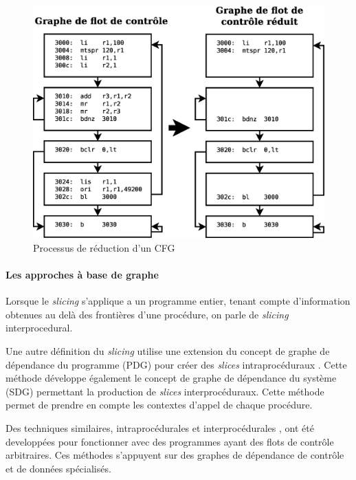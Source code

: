 {      \begin{figure}
        \centering
        \includegraphics[scale=0.3]{slice.eps}
        \caption{Processus de réduction d'un CFG}
        \label{fig:slice}
      \end{figure}

      
      \paragraph{Les approches à base de graphe}
      { Lorsque le \textit{slicing} s'applique a un programme entier, tenant
        compte d'information obtenues au delà des frontières d'une procédure, on
        parle de \textit{slicing} interprocedural.

        Une autre définition du \textit{slicing} utilise une extension du
        concept de graphe de dépendance du programme (PDG) pour créer des
        \textit{slices} intraprocéduraux \cite{HRB90}. Cette méthode développe
        également le concept de graphe de dépendance du système (SDG) permettant
        la production de \textit{slices} interprocéduraux. Cette méthode permet
        de prendre en compte les contextes d'appel de chaque procédure.

        \medskip
        
        Des techniques similaires, intraprocédurales \cite{CF97} et
        interprocédurales \cite{KJL03}, ont été developpées pour fonctionner avec
        des programmes ayant des flots de contrôle arbitraires. Ces méthodes
        s'appuyent sur des graphes de dépendance de contrôle et de données
        spécialisés. }

}
